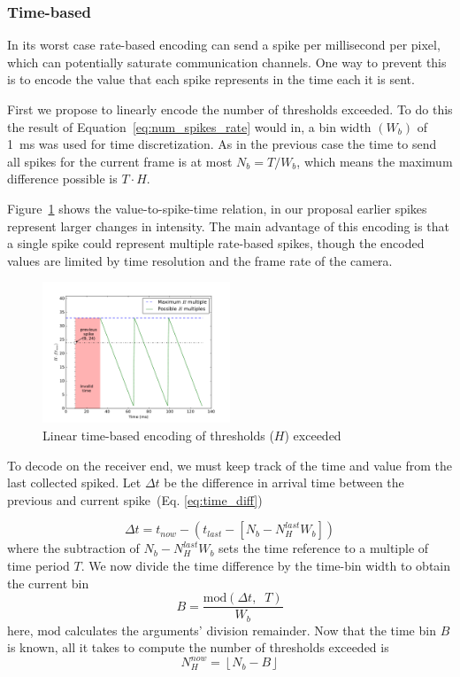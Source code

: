 \documentclass[twocolumn]{article}
\begin{document}
\subsubsection{Time-based}
In its worst case rate-based encoding can send a spike per millisecond per pixel, which can potentially saturate communication channels. One way to prevent this is to encode the value that each spike represents in the time each it is sent.

First we propose to linearly encode the number of thresholds exceeded. To do this the result of Equation~\ref{eq:num_spikes_rate} would in, a bin width $\left(W_{b}\right)$ of 1~ms was used for time discretization. As in the previous case the time to send all spikes for the current frame is at most $N_{b}=T/W_{b}$, which means the maximum difference possible is $T\cdot H$.

Figure~\ref{fig:linear_time} shows the value-to-spike-time relation, in our proposal earlier spikes represent larger changes in intensity. The main advantage of this encoding is that a single spike could represent multiple rate-based spikes, though the encoded values are limited by time resolution and the frame rate of the camera.

\begin{figure}[htb]
  \includegraphics[width=0.5\textwidth]{spike_values_linear}

  \caption{Linear time-based encoding of thresholds ($H$) exceeded}
  \label{fig:linear_time}
\end{figure} 

To decode on the receiver end, we must keep track of the time and value from the last collected spiked. Let $\Delta t$ be the difference in arrival time between the previous and current spike~(Eq. \ref{eq:time_diff})

\begin{equation}
\Delta t = t_{now} - \left( t_{last} - \left[N_{b} - N_{H}^{last}W_{b} \right] \right)
\label{eq:time_diff}
\end{equation}
where the subtraction of $N_{b} - N_{H}^{last}W_{b}$ sets the time reference to a multiple of time period $T$. We now divide the time difference by the time-bin width to obtain the current bin
\begin{equation}
B = \frac{\mathrm{mod}\left(\Delta t, \;\; T\right)}{W_{b}}
\label{eq:bin_compute}
\end{equation}
here, $\mathrm{mod}$ calculates the arguments' division remainder. Now that the time bin $B$ is known, all it takes to compute the number of thresholds exceeded is
\begin{equation}
 N_{H}^{now} = \left\lfloor N_{b} - B \right\rfloor
 \label{eq:new_Nh_linear}
\end{equation}
\end{document}
